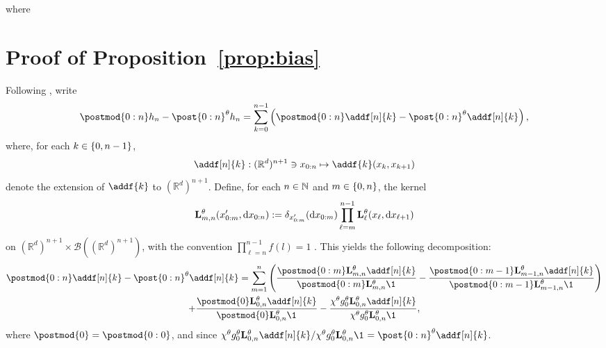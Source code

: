 \documentclass{article}
\begin{document}
where 


\appendix
\section{Proof of Proposition~\ref{prop:bias}}
\label{sec:proof}
Following \cite{gloaguen2019pseudo}, write 
$$
\postmod{0:n} h_n - \post{0:n}^\parvec h_n = \sum_{k = 0}^{n - 1} \left( \postmod{0:n} \addf[n]{k} - \post{0:n}^\parvec \addf[n]{k} \right), 
$$
where, for each $k \in \{ 0, n - 1 \}$, 
\begin{equation} \label{eq:def:addf}
\addf[n]{k} : (\mathbb{R}^d)^{n+1} \ni x_{0:n} \mapsto \addf{k}(x_k, x_{k + 1}) 
\end{equation}
denote the extension of $\addf{k}$ to $(\mathbb{R}^d)^{n+1}$. Define, for each $n \in \mathbb{N}$ and $m \in \{ 0, n \}$, the kernel 
\begin{equation} \label{eq:def:uk:products}
    \mathbf{L}_{m, n}^{\theta}(x_{0:m}', \mathrm{d} x_{0:n}) := \delta_{x_{0:m}'}(\mathrm{d} x_{0:m}) \prod_{\ell = m}^{n - 1} \mathbf{L}_{\ell}^{\theta}(x_\ell, \mathrm{d} x_{\ell + 1}) 
\end{equation}
on $(\mathbb{R}^d)^{n + 1} \times \mathcal{B}((\mathbb{R}^d)^{n + 1})$, with the convention $\prod_{\ell = n}^{n - 1} f(l) = 1$ .  This yields the following decomposition:
\begin{multline*}
\postmod{0:n} \addf[n]{k} - \post{0:n}^\parvec \addf[n]{k} = 
\sum_{m = 1}^n 
\left( 
\frac{\postmod{0:m} \uk{m, n}{\parvec} \addf[n]{k}}{\postmod{0:m} \uk{m, n}{\parvec} \1_{}}
- \frac{\postmod{0:m - 1} \uk{m - 1, n}{\parvec} \addf[n]{k}}{\postmod{0:m - 1} \uk{m - 1, n}{\parvec} \1_{}} 
\right) \\ 
+ \frac{\postmod{0} \uk{0, n}{\parvec} \addf[n]{k}}{\postmod{0} \uk{0, n}{\parvec} \1_{}}
- \frac{\chi^\parvec \md{0}{\parvec}\uk{0, n}{\parvec} \addf[n]{k}}{\chi^\parvec\md{0}{\parvec}\uk{0, n}{\parvec} \1_{}},
\end{multline*}
where $\postmod{0} = \postmod{0:0}$, and since $\chi^\parvec \md{0}{\parvec} \uk{0, n}{\parvec} \addf[n]{k}/\chi^\parvec\md{0}{\parvec}\uk{0, n}{\parvec} \1_{} = \post{0:n}^\parvec \addf[n]{k}$.
\end{document}
